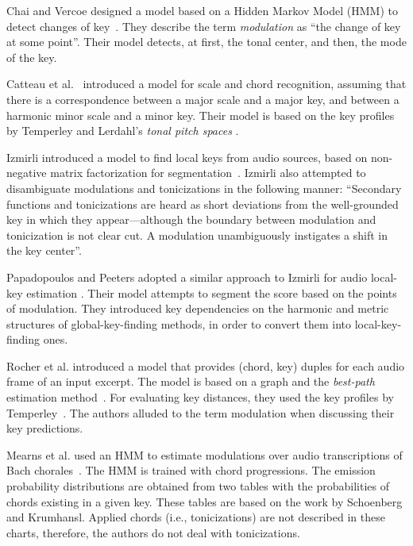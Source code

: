 Chai and Vercoe designed a model based on a Hidden Markov
Model (HMM) to detect changes of
key~\parencite{chai2005detection}. They describe the term
\emph{modulation} as ``the change of key at some point''.
Their model detects, at first, the tonal center, and then,
the mode of the key.

Catteau et al.~\parencite{catteau07tonalkey} introduced a
model for scale and chord recognition, assuming that there
is a correspondence between a major scale and a major key,
and between a harmonic minor scale and a minor key. Their
model is based on the key profiles by Temperley
\parencite{temperley99tonality} and Lerdahl's \emph{tonal
pitch spaces} \parencite{lerdahl88tps}.

Izmirli introduced a model to find local keys from audio
sources, based on non-negative matrix factorization for
segmentation~\parencite{izmirli2007localized}. Izmirli also
attempted to disambiguate modulations and tonicizations in
the following manner: ``Secondary functions and
tonicizations are heard as short deviations from the
well-grounded key in which they appear---although the
boundary between modulation and tonicization is not clear
cut. A modulation unambiguously instigates a shift in the
key center''.

Papadopoulos and Peeters adopted a similar approach to
Izmirli for audio local-key estimation
\parencite{papadopoulos2009local}. Their model attempts to
segment the score based on the points of modulation. They
introduced key dependencies on the harmonic and metric
structures of global-key-finding methods, in order to
convert them into local-key-finding ones.

Rocher et al. introduced a model that provides (chord, key)
duples for each audio frame of an input excerpt. The model
is based on a graph and the \emph{best-path} estimation
method~\parencite{thomas_rocher_2010_1417485}. For
evaluating key distances, they used the key profiles by
Temperley~\parencite{temperley99tonality}. The authors
alluded to the term modulation when discussing their key
predictions.

Mearns et al. used an HMM to estimate modulations over audio
transcriptions of Bach
chorales~\parencite{mearns2011automatically}. The HMM is
trained with chord progressions. The emission probability
distributions are obtained from two tables with the
probabilities of chords existing in a given key. These
tables are based on the work by Schoenberg and Krumhansl.
Applied chords (i.e., tonicizations) are not described in
these charts, therefore, the authors do not deal with
tonicizations.

